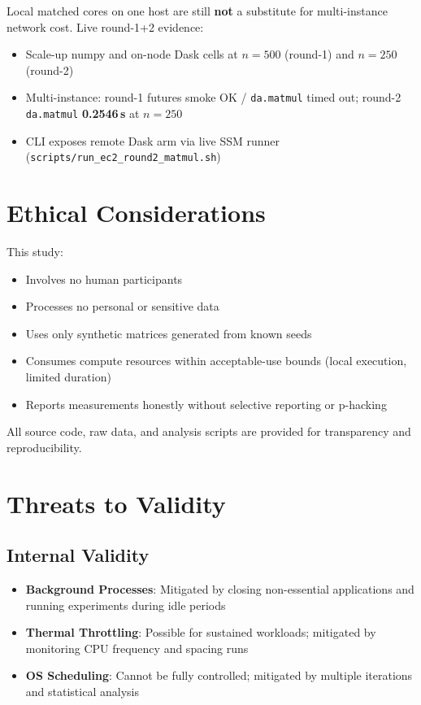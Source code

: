 Local matched cores on one host are still \textbf{not} a substitute for multi-instance network cost. Live round-1+2 evidence:
\begin{itemize}
    \item Scale-up numpy and on-node Dask cells at $n{=}500$ (round-1) and $n{=}250$ (round-2)
    \item Multi-instance: round-1 futures smoke OK / \texttt{da.matmul} timed out; round-2 \texttt{da.matmul} \textbf{0.2546\,s} at $n{=}250$
    \item CLI exposes remote Dask arm via live SSM runner (\texttt{scripts/run\_ec2\_round2\_matmul.sh})
\end{itemize}

\section{Ethical Considerations}

This study:
\begin{itemize}
    \item Involves no human participants
    \item Processes no personal or sensitive data
    \item Uses only synthetic matrices generated from known seeds
    \item Consumes compute resources within acceptable-use bounds (local execution, limited duration)
    \item Reports measurements honestly without selective reporting or p-hacking
\end{itemize}

All source code, raw data, and analysis scripts are provided for transparency and reproducibility.

\section{Threats to Validity}

\subsection{Internal Validity}

\begin{itemize}
    \item \textbf{Background Processes}: Mitigated by closing non-essential applications and running experiments during idle periods
    \item \textbf{Thermal Throttling}: Possible for sustained workloads; mitigated by monitoring CPU frequency and spacing runs
    \item \textbf{OS Scheduling}: Cannot be fully controlled; mitigated by multiple iterations and statistical analysis
\end{itemize}


